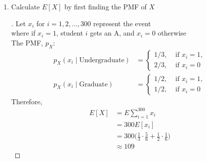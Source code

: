 \documentclass[paper=usletter, fontsize=12pt]{article}
\begin{document}
\begin{enumerate}[label=\textbf{\arabic*}.]
\begin{enumerate}[label=(\alph*)]
            \item Calculate $E[X]$ by first finding the PMF of $X$
            \begin{proof}[\unskip\nopunct]
                Let $x_i$ for $i = 1,2,\ldots,300$ represent the event\\
                where if $x_i=1$, student $i$ gets an A, and $x_i=0$ otherwise\\
                The PMF, $p_X$:
                \begin{align*}
                    p_X(x_i \mid \text{Undergraduate})
                    & = \begin{cases}
                        1/3, & \text{ if } x_i = 1, \\
                        2/3, & \text{ if } x_i = 0
                    \end{cases} \\
                    p_X(x_i \mid \text{Graduate})
                    & = \begin{cases}
                        1/2, & \text{ if } x_i = 1, \\
                        1/2, & \text{ if } x_i = 0
                    \end{cases}
                \end{align*}
                Therefore,
                \begingroup
                \addtolength{\jot}{1em}
                \begin{align*}
                    E[X] &= E \sum_{i=1}^{300} x_i \\
                    &= 300E[x_i] \\
                    &= 300 \bigg( \frac{1}{3} \cdot \frac{5}{6} + \frac{1}{2} \cdot \frac{1}{6} \bigg) \\
                    & \approx 109
                \end{align*} \qedhere
                \endgroup
            \end{proof}
            \vspace{0.2in}


\end{enumerate}
\end{enumerate}
\end{document}
